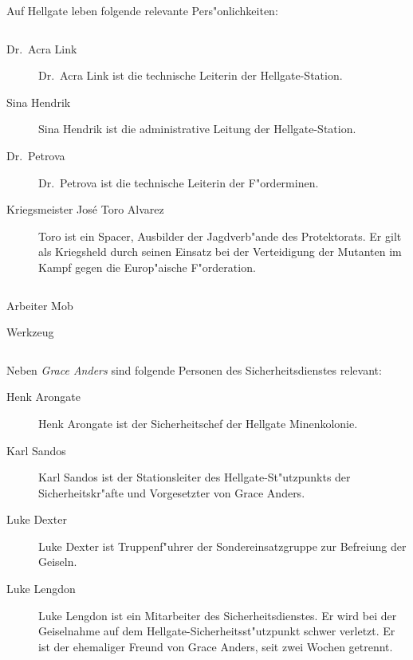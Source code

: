 
Auf Hellgate leben folgende relevante Pers"onlichkeiten:

\begin{column}[l]{0.45}
    \begin{description}
        \item[Dr.~Acra Link] Dr.~Acra Link ist die technische Leiterin der Hellgate-Station.
        \item[Sina Hendrik] Sina Hendrik ist die administrative Leitung der Hellgate-Station.
        \item[Dr.~Petrova] Dr.~Petrova ist die technische Leiterin der F"orderminen.
        \item[Kriegsmeister Jos\'{e} \frqq{}Toro\flqq{} Alvarez] Toro ist ein Spacer, Ausbilder der Jagdverb"ande des Protektorats. Er gilt 
            als Kriegsheld durch seinen Einsatz bei der Verteidigung der Mutanten im Kampf gegen die Europ"aische F"orderation.
    \end{description}
\end{column}
\begin{column}[r]{0.45}
    \begin{nscsheet}[h]{Arbeiter Mob}
        \nscstats[]
        \nscruler
        \begin{nscinventory}
            \nscitem[Waffen] Werkzeug
        \end{nscinventory}
    \end{nscsheet}
\end{column}


Neben \emph{Grace Anders} sind folgende Personen des Sicherheitsdienstes relevant:

\begin{description}
    \item[Henk Arongate] Henk Arongate ist der Sicherheitschef der Hellgate Minenkolonie.
    \item[Karl Sandos] Karl Sandos ist der Stationsleiter des Hellgate-St"utzpunkts der Sicherheitskr"afte und Vorgesetzter von Grace 
        Anders.
    \item[Luke Dexter] Luke Dexter ist Truppenf"uhrer der Sondereinsatzgruppe zur Befreiung der Geiseln.
    \item[Luke Lengdon] Luke Lengdon ist ein Mitarbeiter des Sicherheitsdienstes. Er wird bei der Geiselnahme auf dem 
        Hellgate-Sicherheitsst"utzpunkt schwer verletzt. Er ist der ehemaliger Freund von Grace Anders, seit zwei Wochen getrennt.
\end{description}

\vfill\pagebreak